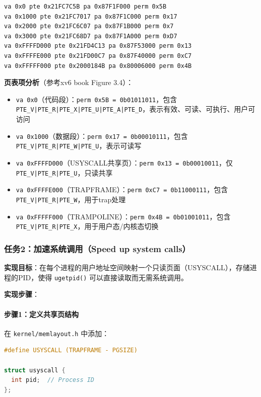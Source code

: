 \begin{lstlisting}
va 0x0 pte 0x21FC7C5B pa 0x87F1F000 perm 0x5B
va 0x1000 pte 0x21FC7017 pa 0x87F1C000 perm 0x17
va 0x2000 pte 0x21FC6C07 pa 0x87F1B000 perm 0x7
va 0x3000 pte 0x21FC68D7 pa 0x87F1A000 perm 0xD7
va 0xFFFFD000 pte 0x21FD4C13 pa 0x87F53000 perm 0x13
va 0xFFFFE000 pte 0x21FD00C7 pa 0x87F40000 perm 0xC7
va 0xFFFFF000 pte 0x2000184B pa 0x80006000 perm 0x4B
\end{lstlisting}

\textbf{页表项分析}（参考xv6 book Figure 3.4）：

\begin{itemize}
    \item \texttt{va 0x0}（代码段）：\texttt{perm 0x5B = 0b01011011}，包含 \texttt{PTE\_V|PTE\_R|PTE\_X|PTE\_U|PTE\_A|PTE\_D}，表示有效、可读、可执行、用户可访问
    \item \texttt{va 0x1000}（数据段）：\texttt{perm 0x17 = 0b00010111}，包含 \texttt{PTE\_V|PTE\_R|PTE\_W|PTE\_U}，表示可读写
    \item \texttt{va 0xFFFFD000}（USYSCALL共享页）：\texttt{perm 0x13 = 0b00010011}，仅 \texttt{PTE\_V|PTE\_R|PTE\_U}，只读共享
    \item \texttt{va 0xFFFFE000}（TRAPFRAME）：\texttt{perm 0xC7 = 0b11000111}，包含 \texttt{PTE\_V|PTE\_R|PTE\_W}，用于trap处理
    \item \texttt{va 0xFFFFF000}（TRAMPOLINE）：\texttt{perm 0x4B = 0b01001011}，包含 \texttt{PTE\_V|PTE\_R|PTE\_X}，用于用户态/内核态切换
\end{itemize}

\subsubsection{任务2：加速系统调用（Speed up system calls）}

\textbf{实现目标}：在每个进程的用户地址空间映射一个只读页面（USYSCALL），存储进程的PID，使得 \texttt{ugetpid()} 可以直接读取而无需系统调用。

\textbf{实现步骤}：

\paragraph{步骤1：定义共享页结构}

在 \texttt{kernel/memlayout.h} 中添加：

\begin{lstlisting}[language=C]
#define USYSCALL (TRAPFRAME - PGSIZE)

struct usyscall {
  int pid;  // Process ID
};
\end{lstlisting}

